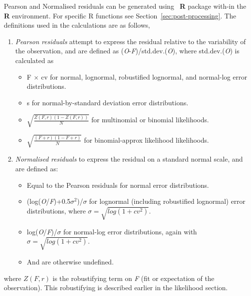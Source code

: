 Pearson and Normalised residuals can be generated using \CNAME\ \textbf{R} package with-in the \textbf{R} environment. For specific R functions see Section~\ref{sec:post-processing}. The definitions used in the calculations are as follows,

\begin{enumerate}
	\item \textit{Pearson residuals} attempt to express the residual relative to the variability of the observation, and are defined as (\textit{O}-\textit{F})/std.dev.(\textit{O}), where std.dev.(\textit{O}) is calculated as
	\begin{itemize}
			\item F $\times$ cv for normal, lognormal, robustified lognormal, and normal-log error distributions.
			\item s for normal-by-standard deviation error distributions.
			\item $\sqrt{\frac{Z(\textit{F},r)(1 - Z(\textit{F},r))}{N}}$ for multinomial or binomial likelihoods.
			\item $\sqrt{\frac{(\textit{F} + r)(1 - \textit{F} + r)}{N}}$ for binomial-approx likelihood likelihoods.
	\end{itemize}
	\item \textit{Normalised residuals} to express the residual on a standard normal scale, and are defined as:
	\begin{itemize}
		\item Equal to the Pearson residuals for normal error distributions.
		\item (log(\textit{O}/\textit{F})+0.5$\sigma^2$)/$\sigma$ for lognormal (including robustified lognormal) error distributions, where $\sigma= \sqrt{log(1 + cv^2)}$.
		\item  log(\textit{O}/\textit{F})/$\sigma$ for normal-log error distributions, again with $\sigma= \sqrt{log(1 + cv^2)}$.
		\item And are otherwise undefined.
	\end{itemize}	
\end{enumerate}

where $Z(\textit{F},r)$ is the robustifying term on \textit{F} (fit or expectation of the observation). This robustifying is described earlier in the likelihood section.



